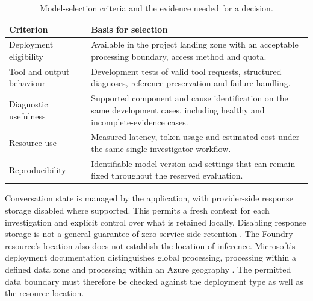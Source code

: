 \begin{table}[htbp]
\centering\small
\caption{Model-selection criteria and the evidence needed for a decision.}
\label{tab:design:model}
\begin{tabularx}{\textwidth}{@{}>{\raggedright\arraybackslash}p{}>{\raggedright\arraybackslash}X@{}}
\toprule
Criterion & Basis for selection \\
\midrule
Deployment eligibility & Available in the project landing zone with an acceptable processing boundary, access method and quota. \\
\addlinespace
Tool and output behaviour & Development tests of valid tool requests, structured diagnoses, reference preservation and failure handling. \\
\addlinespace
Diagnostic usefulness & Supported component and cause identification on the same development cases, including healthy and incomplete-evidence cases. \\
\addlinespace
Resource use & Measured latency, token usage and estimated cost under the same single-investigator workflow. \\
\addlinespace
Reproducibility & Identifiable model version and settings that can remain fixed throughout the reserved evaluation. \\
\bottomrule
\end{tabularx}
\end{table}


Conversation state is managed by the application, with provider-side
response storage disabled where supported. This permits a fresh context
for each investigation and explicit control over what is retained locally.
Disabling response storage is not a general guarantee of zero service-side
retention \parencite{microsoft2026responses}. The Foundry resource's
location also does not establish the location of inference. Microsoft's
deployment documentation distinguishes global processing, processing
within a defined data zone and processing within an Azure geography
\parencite{microsoft2026foundrydeployments}. The permitted data boundary
must therefore be checked against the deployment type as well as the
resource location.


